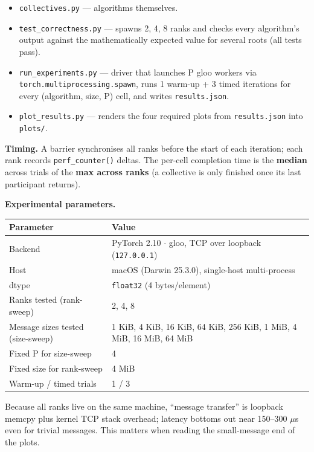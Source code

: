 \documentclass[11pt]{article}
\begin{document}
\begin{itemize}
  \item \texttt{collectives.py} --- algorithms themselves.
  \item \texttt{test\_correctness.py} --- spawns 2, 4, 8 ranks and checks every
        algorithm's output against the mathematically expected value for
        several roots (all tests pass).
  \item \texttt{run\_experiments.py} --- driver that launches P gloo workers via
        \texttt{torch.multiprocessing.spawn}, runs 1 warm-up + 3 timed iterations
        for every (algorithm, size, P) cell, and writes \texttt{results.json}.
  \item \texttt{plot\_results.py} --- renders the four required plots from
        \texttt{results.json} into \texttt{plots/}.
\end{itemize}

\textbf{Timing.} A barrier synchronises all ranks before the start of each
iteration; each rank records \texttt{perf\_counter()} deltas. The per-cell
completion time is the \textbf{median} across trials of the \textbf{max across
ranks} (a collective is only finished once its last participant
returns).

\textbf{Experimental parameters.}

\begin{center}
\begin{tabularx}{\linewidth}{lX}
\toprule
\textbf{Parameter} & \textbf{Value} \\
\midrule
Backend & PyTorch 2.10 $\cdot$ gloo, TCP over loopback (\texttt{127.0.0.1}) \\
Host & macOS (Darwin 25.3.0), single-host multi-process \\
dtype & \texttt{float32} (4 bytes/element) \\
Ranks tested (rank-sweep) & 2, 4, 8 \\
Message sizes tested (size-sweep) & 1 KiB, 4 KiB, 16 KiB, 64 KiB, 256 KiB, 1 MiB, 4 MiB, 16 MiB, 64 MiB \\
Fixed P for size-sweep & 4 \\
Fixed size for rank-sweep & 4 MiB \\
Warm-up / timed trials & 1 / 3 \\
\bottomrule
\end{tabularx}
\end{center}

Because all ranks live on the same machine, ``message transfer'' is
loopback memcpy plus kernel TCP stack overhead; latency bottoms out
near 150--300 $\mu$s even for trivial messages. This matters when reading
the small-message end of the plots.
\end{document}
